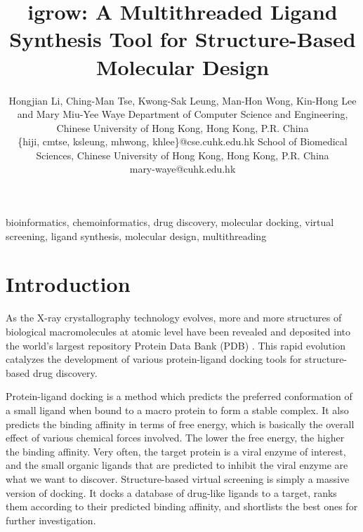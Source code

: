\documentclass[10pt, conference, compsocconf]{../IEEEtran}
\begin{document}
\title{igrow: A Multithreaded Ligand Synthesis Tool for Structure-Based Molecular Design} %
\author
{
\IEEEauthorblockN
{
Hongjian Li, Ching-Man Tse, Kwong-Sak Leung, Man-Hon Wong, Kin-Hong Lee and Mary Miu-Yee Waye
\IEEEauthorblockA
{
Department of Computer Science and Engineering, Chinese University of Hong Kong, Hong Kong, P.R. China\\
\{hiji, cmtse, ksleung, mhwong, khlee\}@cse.cuhk.edu.hk
}
\IEEEauthorblockA
{
School of Biomedical Sciences, Chinese University of Hong Kong, Hong Kong, P.R. China\\
mary-waye@cuhk.edu.hk
}
}
}
\maketitle

\begin{abstract}



\end{abstract}

\begin{IEEEkeywords}

bioinformatics, chemoinformatics, drug discovery, molecular docking, virtual screening, ligand synthesis, molecular design, multithreading

\end{IEEEkeywords}

\section{Introduction}

As the X-ray crystallography technology evolves, more and more structures of biological macromolecules at atomic level have been revealed and deposited into the world's largest repository Protein Data Bank (PDB) \cite{539,537}. This rapid evolution catalyzes the development of various protein-ligand docking tools for structure-based drug discovery.

Protein-ligand docking is a method which predicts the preferred conformation of a small ligand when bound to a macro protein to form a stable complex. It also predicts the binding affinity in terms of free energy, which is basically the overall effect of various chemical forces involved. The lower the free energy, the higher the binding affinity. Very often, the target protein is a viral enzyme of interest, and the small organic ligands that are predicted to inhibit the viral enzyme are what we want to discover. Structure-based virtual screening is simply a massive version of docking. It docks a database of drug-like ligands to a target, ranks them according to their predicted binding affinity, and shortlists the best ones for further investigation.
\end{document}
